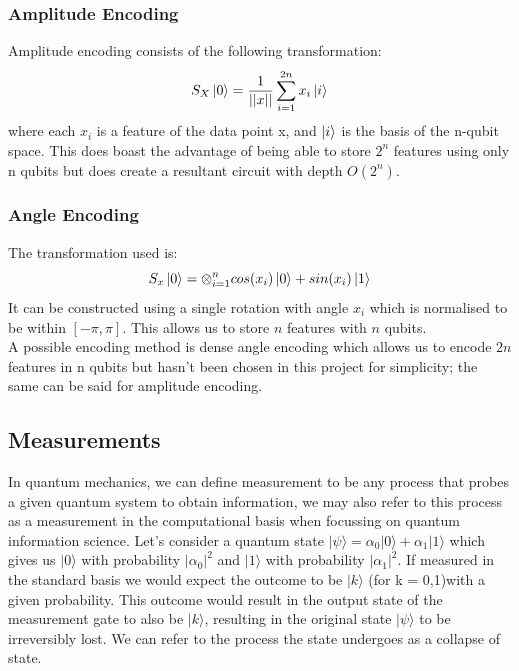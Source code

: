 \documentclass[12pt]{article}
\numberwithin{equation}{section}
\begin{document}
\subsubsection{Amplitude Encoding}
Amplitude encoding consists of the following transformation:\\
\begin{equation}
S_X \ket{0} = \frac{1}{||x||}\sum^{2n}_{i=1}{x_i\ket{i}}
\end{equation}
where each $x_i$ is a feature of the data point x, and $\ket{i}$ is the basis 
of the n-qubit
space. This does boast the advantage of being able to store $2^n$ features using 
only n qubits but does create a resultant circuit with depth $O(2^n)$.

\subsubsection{Angle Encoding}
The transformation used is:
\begin{equation}
S_x\ket{0} = \otimes^n_{i=1} cos(x_i)\ket{0} + sin(x_i)\ket{1}
\end{equation}
It can be constructed using a single rotation with angle $x_i$ which is 
normalised to be within $[-\pi,\pi]$. This allows us to store $n$ features with 
$n$ qubits.
\\
A possible encoding method is dense angle encoding which allows us to encode $2n$ 
features in n qubits but hasn't been chosen in this project for simplicity; the 
same can be said for amplitude encoding.


\subsection{Measurements}
In quantum mechanics, we can define measurement to be any process that probes a 
given quantum system to obtain information, we may also refer to this process as 
a measurement in the computational basis when focussing on quantum information 
science. Let's consider a quantum state 
$|\psi \rangle = \alpha_0|0\rangle+\alpha_1|1\rangle$ which gives us $|0\rangle$
with probability $|\alpha_0|^2$ and $|1\rangle$ with probability $|\alpha_1|^2$. 
If measured in the standard basis we would expect the outcome to be $|k\rangle$
(for k = 0,1)with a given probability. This outcome would result in the output 
state of the measurement gate to also be $|k\rangle$, resulting in the original 
state $|\psi\rangle$ to be irreversibly lost. We can refer to the process the state 
undergoes as a collapse of state. 
\end{document}
